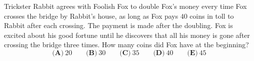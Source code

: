 Trickster Rabbit agrees with Foolish Fox to double Fox's money every time Fox crosses the bridge by Rabbit's house, as long as Fox pays $40$ coins in toll to Rabbit after each crossing. The payment is made after the doubling. Fox is excited about his good fortune until he discovers that all his money is gone after crossing the bridge three times. How many coins did Fox have at the beginning?
\[\textbf{(A)}\ 20\qquad\textbf{(B)}\ 30\qquad\textbf{(C)}\ 35\qquad\textbf{(D)}\ 40\qquad\textbf{(E)}\ 45\]
